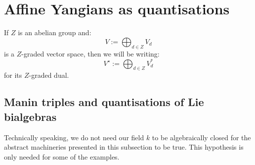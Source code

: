 \section{Affine Yangians as quantisations}
    \begin{convention}
        If $Z$ is an abelian group and:
            $$V := \bigoplus_{d \in Z} V_d$$
        is a $Z$-graded vector space, then we will be writing:
            $$V^{\star} := \bigoplus_{d \in Z} V_d^*$$
        for its $Z$-graded dual.
    \end{convention}

    \subsection{Manin triples and quantisations of Lie bialgebras} \label{subsection: manin_triples_and_quantisations_of_lie_bialgebras}
        \begin{remark}
            Technically speaking, we do not need our field $k$ to be algebraically closed for the abstract machineries presented in this subsection to be true. This hypothesis is only needed for some of the examples. 
        \end{remark}
    
